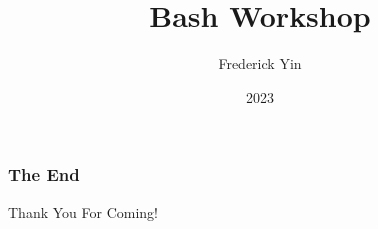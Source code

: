 \documentclass{beamer}
\title{Bash Workshop}
\author{Frederick Yin}
\institute{JITech}
\date{2023}
\begin{document}
\frame{\titlepage}




\begin{frame}
\frametitle{The End}
\vspace{1cm}
\centering \Huge {Thank You For Coming!}
\end{frame}
\end{document}
